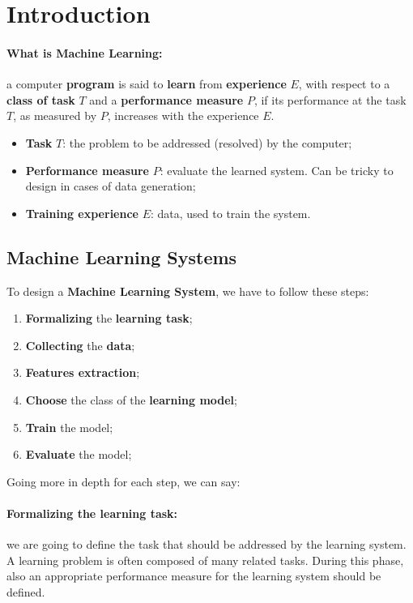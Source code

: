 \section{Introduction}

\paragraph{What is Machine Learning:} a computer \textbf{program} is said to \textbf{learn} from \textbf{experience} $E$, with respect to a \textbf{class of task} $T$ and a \textbf{performance measure} $P$, if its performance at the task $T$, as measured by $P$, increases with the experience $E$.
\begin{itemize}
    \item \textbf{Task} $T$: the problem to be addressed (resolved) by the computer;
    \item \textbf{Performance measure} $P$: evaluate the learned system. Can be tricky to design in cases of data generation;
    \item \textbf{Training experience} $E$: data, used to train the system.
\end{itemize}

\subsection{Machine Learning Systems}
To design a \textbf{Machine Learning System}, we have to follow these steps:
\begin{enumerate}
    \item \textbf{Formalizing} the \textbf{learning task};
    \item \textbf{Collecting} the \textbf{data};
    \item \textbf{Features extraction};
    \item \textbf{Choose} the class of the \textbf{learning model};
    \item \textbf{Train} the model;
    \item \textbf{Evaluate} the model;
\end{enumerate}
Going more in depth for each step, we can say:

\paragraph{Formalizing the learning task:} we are going to define the task that should be addressed by the learning system. 
A learning problem is often composed of many related tasks. During this phase, also an appropriate performance 
measure for the learning system should be defined.

